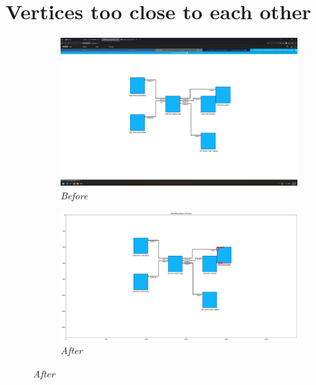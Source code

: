 \documentclass{article}
\begin{document}
\section{Vertices too close to each other}
\begin{figure}[H]
    \centering
    \begin{subfigure}[t]{0.9\textwidth}
        \centering
        \includegraphics[width=\textwidth]{testcases/vertices_too_close/140151-897377_input_image.png}
        \caption*{\textit{Before}}
    \end{subfigure}
    \newline
    \begin{subfigure}[t]{0.9\textwidth}
        \centering
        \includegraphics[width=\textwidth]{testcases/vertices_too_close/140211-889490_element_bbox_errors_labeled_colored.png}
        \caption*{\textit{After}}
    \end{subfigure}
    \label{fig:vertices_too_close}
\end{figure}
\newpage
\end{document}
